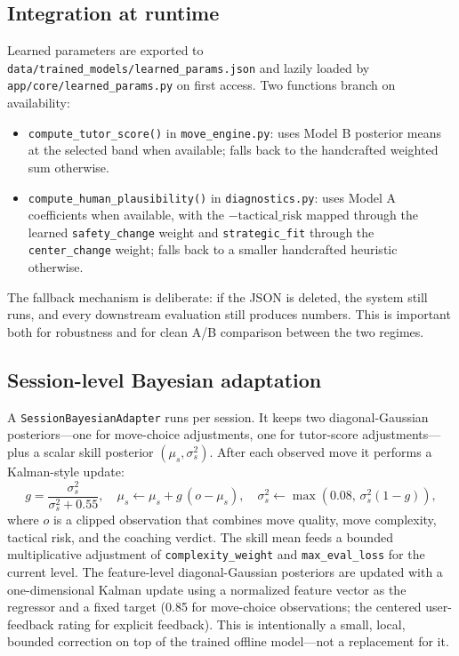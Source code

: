 \documentclass[11pt]{article}
\begin{document}
\subsection{Integration at runtime}
Learned parameters are exported to \texttt{data/trained\_models/learned\_params.json} and lazily loaded by \texttt{app/core/learned\_params.py} on first access. Two functions branch on availability:

\begin{itemize}[leftmargin=*,topsep=0pt,itemsep=1pt]
\item \texttt{compute\_tutor\_score()} in \texttt{move\_engine.py}: uses Model B posterior means at the selected band when available; falls back to the handcrafted weighted sum otherwise.
\item \texttt{compute\_human\_plausibility()} in \texttt{diagnostics.py}: uses Model A coefficients when available, with the $-\text{tactical\_risk}$ mapped through the learned \texttt{safety\_change} weight and \texttt{strategic\_fit} through the \texttt{center\_change} weight; falls back to a smaller handcrafted heuristic otherwise.
\end{itemize}

The fallback mechanism is deliberate: if the JSON is deleted, the system still runs, and every downstream evaluation still produces numbers. This is important both for robustness and for clean A/B comparison between the two regimes.

\subsection{Session-level Bayesian adaptation}
A \texttt{SessionBayesianAdapter} runs per session. It keeps two diagonal-Gaussian posteriors---one for move-choice adjustments, one for tutor-score adjustments---plus a scalar skill posterior $(\mu_s,\sigma_s^2)$. After each observed move it performs a Kalman-style update:
\[
g = \frac{\sigma_s^2}{\sigma_s^2 + 0.55},\quad
\mu_s \leftarrow \mu_s + g\,(o - \mu_s),\quad
\sigma_s^2 \leftarrow \max(0.08,\,\sigma_s^2(1-g)),
\]
where $o$ is a clipped observation that combines move quality, move complexity, tactical risk, and the coaching verdict. The skill mean feeds a bounded multiplicative adjustment of \texttt{complexity\_weight} and \texttt{max\_eval\_loss} for the current level. The feature-level diagonal-Gaussian posteriors are updated with a one-dimensional Kalman update using a normalized feature vector as the regressor and a fixed target (0.85 for move-choice observations; the centered user-feedback rating for explicit feedback). This is intentionally a small, local, bounded correction on top of the trained offline model---not a replacement for it.
\end{document}
